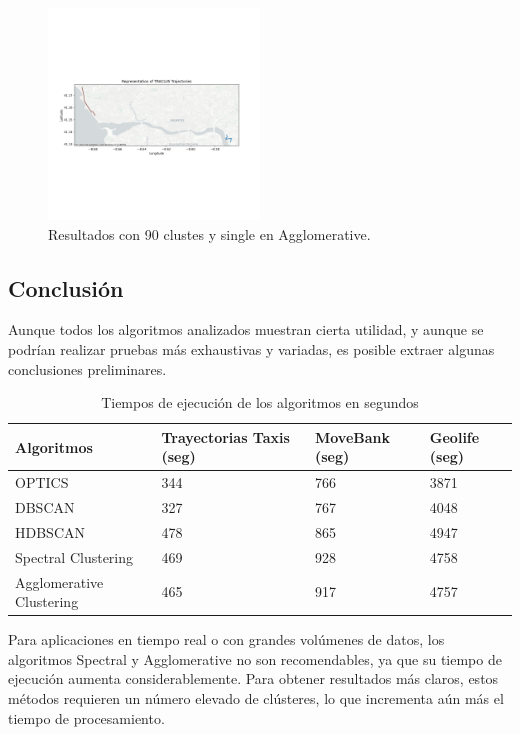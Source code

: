 \begin{figure}[h!]
    \centering
    \includegraphics[width=0.5\textwidth]{img/Taxis/map_agglo_par.png}
    \caption{Resultados con 90 clustes y single en Agglomerative.}
    \label{fig:agglo_par}
\end{figure}

\subsection{Conclusión}

Aunque todos los algoritmos analizados muestran cierta utilidad, y aunque se podrían realizar pruebas más exhaustivas y variadas, es posible extraer algunas conclusiones preliminares.

\begin{table}[ht]
\centering
\begin{tabular}{|p{3.0cm}||p{3.0cm}|p{3.0cm}|p{3.0cm}|}
\hline
\textbf{Algoritmos} & \textbf{Trayectorias Taxis (seg)} & \textbf{MoveBank (seg)} & \textbf{Geolife (seg)}  \\
\hline
OPTICS & 344 & 766 & 3871 \\
DBSCAN & 327 & 767 & 4048 \\
HDBSCAN & 478 & 865 & 4947 \\
Spectral Clustering & 469 & 928 & 4758 \\
Agglomerative Clustering & 465 & 917 & 4757 \\
\hline
\end{tabular}
\caption{Tiempos de ejecución de los algoritmos en segundos}
\label{tabla:comparacion_algoritmos}
\end{table}

Para aplicaciones en tiempo real o con grandes volúmenes de datos, los algoritmos Spectral y Agglomerative no son recomendables, ya que su tiempo de ejecución aumenta considerablemente. Para obtener resultados más claros, estos métodos requieren un número elevado de clústeres, lo que incrementa aún más el tiempo de procesamiento.

